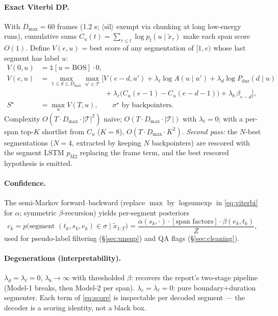 \documentclass[10pt]{article}
\newcommand{\ind}[1]{\mathbb{1}\!\left[#1\right]}
\newcommand{\Tok}{\mathcal{T}}
\newcommand{\sil}{\langle\mathrm{sil}\rangle}
\begin{document}
\paragraph{Exact Viterbi DP.} With $D_{\max} = 60$ frames (1.2 s; $\sil$ exempt via chunking at long low-energy runs), cumulative sums $C_u(t) = \sum_{\tau \le t} \log p_{\mathrm{f}}(u \mid \tilde x_\tau)$ make each span score $O(1)$. Define $V(e, u)$ = best score of any segmentation of $[1, e)$ whose last segment has label $u$:
\begin{align}
V(0, u) &= \ind{u = \mathrm{BOS}} \cdot 0, \nonumber\\
V(e, u) &= \max_{1 \le d \le D_{\max}} \max_{u' \in \Tok} \Big[ V(e-d, u') + \lambda_\ell \log A(u \mid u') + \lambda_d \log P_{\mathrm{dur}}(d \mid u) \nonumber\\
&\hspace{9em} + \lambda_c \big(C_u(e-1) - C_u(e-d-1)\big) + \lambda_b\, \beta_{e-d} \Big],
\label{eq:viterbi}\\
S^\star &= \max_u V(T, u), \qquad \sigma^\star \text{ by backpointers}. \nonumber
\end{align}
Complexity $O(T \cdot D_{\max} \cdot |\Tok|^2)$ naive; $O(T \cdot D_{\max} \cdot |\Tok|)$ with $\lambda_\ell = 0$; with a per-span top-$K$ shortlist from $C_u$ ($K = 8$), $O(T \cdot D_{\max} \cdot K^2)$. \emph{Second pass:} the $N$-best segmentations ($N = 4$, extracted by keeping $N$ backpointers) are rescored with the segment LSTM $p_{\mathrm{M2}}$ replacing the frame term, and the best rescored hypothesis is emitted.

\paragraph{Confidence.} The semi-Markov forward--backward (replace $\max$ by $\operatorname{logsumexp}$ in \eqref{eq:viterbi} for $\alpha$; symmetric $\beta$-recursion) yields per-segment posteriors
\begin{equation}
c_k = p\big(\text{segment } (t_k, s_k, e_k) \in \sigma \mid \tilde x_{1:T}\big)
= \frac{\alpha(s_k, \cdot) \cdot [\text{span factors}] \cdot \beta(e_k, t_k)}{Z},
\end{equation}
used for pseudo-label filtering (\S\ref{sec:unsup}) and QA flags (\S\ref{sec:cleaning}).

\paragraph{Degenerations (interpretability).} $\lambda_d = \lambda_\ell = 0$, $\lambda_b \to \infty$ with thresholded $\beta$: recovers the report's two-stage pipeline (Model-1 breaks, then Model-2 per span). $\lambda_c = \lambda_\ell = 0$: pure boundary+duration segmenter. Each term of \eqref{eq:score} is inspectable per decoded segment --- the decoder is a scoring identity, not a black box.
\end{document}
